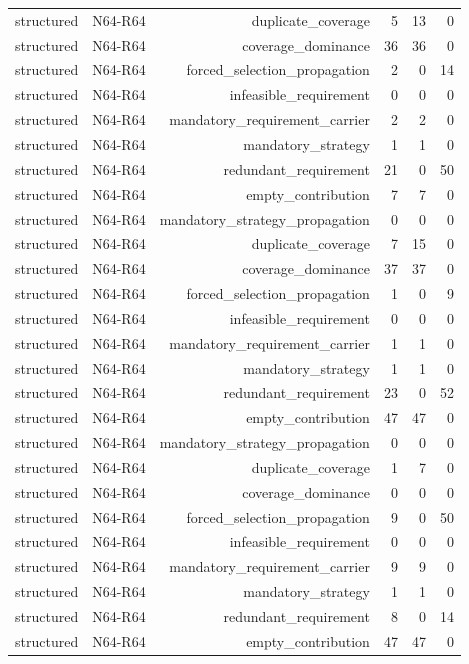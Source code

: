 {\begin{longtable}{lrrrrr}
structured & N64-R64 & duplicate\_coverage & 5 & 13 & 0 \\
structured & N64-R64 & coverage\_dominance & 36 & 36 & 0 \\
structured & N64-R64 & forced\_selection\_propagation & 2 & 0 & 14 \\
structured & N64-R64 & infeasible\_requirement & 0 & 0 & 0 \\
structured & N64-R64 & mandatory\_requirement\_carrier & 2 & 2 & 0 \\
structured & N64-R64 & mandatory\_strategy & 1 & 1 & 0 \\
structured & N64-R64 & redundant\_requirement & 21 & 0 & 50 \\
structured & N64-R64 & empty\_contribution & 7 & 7 & 0 \\
structured & N64-R64 & mandatory\_strategy\_propagation & 0 & 0 & 0 \\
structured & N64-R64 & duplicate\_coverage & 7 & 15 & 0 \\
structured & N64-R64 & coverage\_dominance & 37 & 37 & 0 \\
structured & N64-R64 & forced\_selection\_propagation & 1 & 0 & 9 \\
structured & N64-R64 & infeasible\_requirement & 0 & 0 & 0 \\
structured & N64-R64 & mandatory\_requirement\_carrier & 1 & 1 & 0 \\
structured & N64-R64 & mandatory\_strategy & 1 & 1 & 0 \\
structured & N64-R64 & redundant\_requirement & 23 & 0 & 52 \\
structured & N64-R64 & empty\_contribution & 47 & 47 & 0 \\
structured & N64-R64 & mandatory\_strategy\_propagation & 0 & 0 & 0 \\
structured & N64-R64 & duplicate\_coverage & 1 & 7 & 0 \\
structured & N64-R64 & coverage\_dominance & 0 & 0 & 0 \\
structured & N64-R64 & forced\_selection\_propagation & 9 & 0 & 50 \\
structured & N64-R64 & infeasible\_requirement & 0 & 0 & 0 \\
structured & N64-R64 & mandatory\_requirement\_carrier & 9 & 9 & 0 \\
structured & N64-R64 & mandatory\_strategy & 1 & 1 & 0 \\
structured & N64-R64 & redundant\_requirement & 8 & 0 & 14 \\
structured & N64-R64 & empty\_contribution & 47 & 47 & 0 \\

\end{longtable}}

